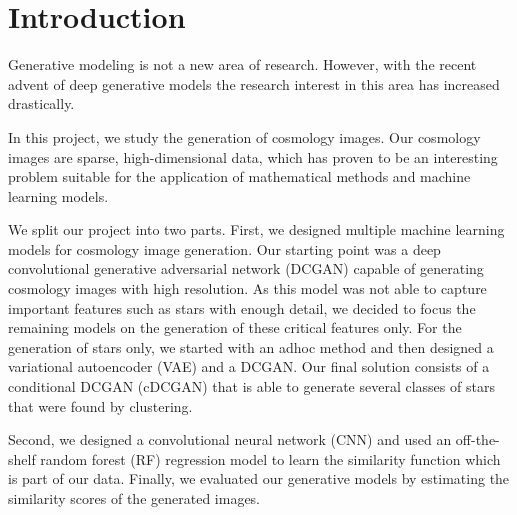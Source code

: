 \documentclass[10pt,conference,compsocconf]{IEEEtran}
\newcommand\TODO[1]{\textcolor{red}{#1}} %
\begin{document}
\begin{abstract}

\end{abstract}

\section{Introduction}
\label{sec:introduction}
Generative modeling is not a new area of research. However, with the recent advent of deep generative models the research interest in this area has increased drastically. 

In this project, we study the generation of cosmology images. Our cosmology images are sparse, high-dimensional data, which has proven to be an interesting problem suitable for the application of mathematical methods and machine learning models.

We split our project into two parts. First, we designed multiple machine learning models for cosmology image generation. Our starting point was a deep convolutional generative adversarial network (DCGAN) capable of generating cosmology images with high resolution. As this model was not able to capture important features such as stars with enough detail, we decided to focus the remaining models on the generation of these critical features only. For the generation of stars only, we started with an adhoc method and then designed a variational autoencoder (VAE) and a DCGAN. 
Our final solution consists of a conditional DCGAN (cDCGAN) that is able to generate several classes of stars that were found by clustering.

Second, we designed a convolutional neural network (CNN) and used an off-the-shelf random forest (RF) regression model to learn the similarity function which is part of our data. Finally, we evaluated our generative models by estimating the similarity scores of the generated images.
\end{document}
